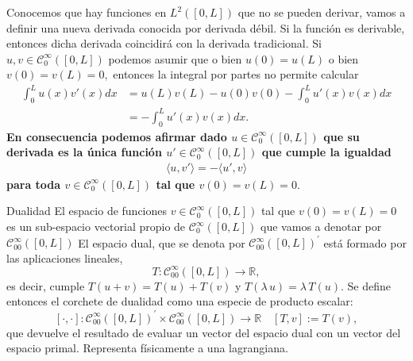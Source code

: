 \documentclass[10pt,handout]{beamer}
\theoremstyle{plain} %
\theoremstyle{plain} %
\theoremstyle{plain} %
\theoremstyle{plain} %
\theoremstyle{definition}
\theoremstyle{example}
\theoremstyle{example}
\theoremstyle{remark}
\theoremstyle{remark}
\begin{document}
\begin{frame}
Conocemos que hay funciones en $L^2([0,L])$ que no se pueden derivar, vamos a definir una nueva
derivada conocida por derivada débil. Si la función es derivable, entonces dicha derivada coincidirá con la derivada tradicional. Si $u,v\in \mathcal{C}_0^{\infty}([0,L])$ podemos asumir que o bien
$u(0)=u(L)$ o bien $v(0)=v(L)=0,$ entonces la integral por partes no permite calcular
\begin{align*}
\int_0^L u(x)v'(x)dx & = u(L)v(L)- u(0)v(0)- \int_0^L u'(x)v(x)dx \\ 
& = - \int_0^L u'(x)v(x)dx.
\end{align*}
\textbf{En consecuencia podemos afirmar dado $u \in \mathcal{C}_0^{\infty}([0,L])$ que su derivada 
es la única función $u'\in \mathcal{C}_0^{\infty}([0,L])$ que cumple la igualdad
\begin{align}
\langle u , v' \rangle = -\langle u' , v \rangle  
\end{align}
para toda $v \in \mathcal{C}_0^{\infty}([0,L])$ tal que $v(0)=v(L)=0.$}
\end{frame}

\begin{frame}{Dualidad}
El espacio de funciones $v \in \mathcal{C}_0^{\infty}([0,L])$ tal que $v(0)=v(L)=0$ es un sub-espacio vectorial propio de $\mathcal{C}_0^{\infty}([0,L])$ que vamos a denotar por
$\mathcal{C}_{00}^{\infty}([0,L])$ El espacio dual, que se denota por $\mathcal{C}_{00}^{\infty}([0,L])^{\prime}$ está formado
por las aplicaciones lineales,
$$
T: \mathcal{C}_{00}^{\infty}([0,L]) \longrightarrow \mathbb{R},
$$
es decir, cumple $T(u+v)=T(u)+T(v)$ y $T(\lambda\, u) = \lambda \, T(u).$
Se define entonces el corchete de dualidad como una especie de producto escalar:
$$
[\cdot,\cdot]:\mathcal{C}_{00}^{\infty}([0,L])^{\prime} \times \mathcal{C}_{00}^{\infty}([0,L]) \longrightarrow \mathbb{R} \quad [T,v]:=T(v),
$$
que devuelve el resultado de evaluar un vector del espacio dual con un vector del espacio primal. Representa físicamente a una lagrangiana.
\end{frame}
\end{document}
